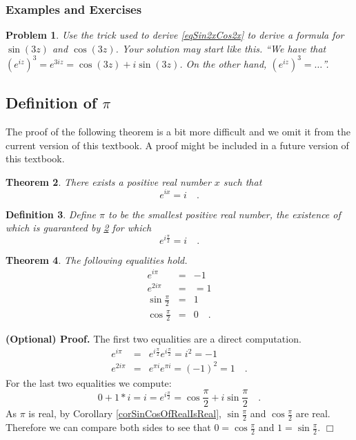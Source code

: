 \documentclass[12pt]{book}
\newenvironment{proofOptional}[1][]{ \noindent \textbf{(Optional) Proof#1.}}{$\Box$\medskip}
\newtheorem{theorem}{Theorem}[section]
\newtheorem{definition}[theorem]{Definition}
\newtheorem{problem}[theorem]{Problem}
\begin{document}
\subsubsection{Examples and Exercises}
\begin{problem}
Use the trick used to derive \eqref{eqSin2xCos2x} to derive a formula for $\sin(3z)$ and $\cos (3z)$. Your solution may start like this. ``We have that $(e^{iz})^3=e^{3iz}=\cos (3z)+i\sin(3z)$. On the other hand, $(e^{iz})^3= \dots$''.
\end{problem}
\subsection{Definition of $\pi$}
\label{secDefinitionPi}

The proof of the following theorem is a bit more difficult and we omit it from the current version of this textbook. A proof might be included in a future version of this textbook.
\begin{theorem}\label{thPiExists}
There exists a positive real number $x$ such that \index{$\pi$}
\begin{equation}\boxed{
e^{ix}=i\quad .
}
\end{equation}
\end{theorem}

\begin{definition}
Define $\pi$ to be the smallest positive real number, the existence of which is guaranteed by \ref{thPiExists} for which
\begin{equation}\boxed{
e^{i\frac{\pi}{2} }= i\quad .
}
\end{equation}
\end{definition}



\begin{theorem} The following equalities hold.
\begin{equation}\label{eqe^ipi}
\begin{array}{rcl}
\displaystyle e^{i\pi}&=&-1\\
\displaystyle e^{2i\pi}&=&=1\\
\displaystyle \sin \frac{\pi}2 &=& 1\\
\displaystyle \cos \frac{\pi}2 &=& 0\quad .
\end{array}
\end{equation}
\end{theorem}
\begin{proofOptional}
The first two equalities are a direct computation.
\[
\begin{array}{rcl}
\displaystyle e^{i\pi}&=&\displaystyle  e^{i\frac{\pi}2}e^{i\frac{\pi}2}= i^2= -1\\
\displaystyle e^{2i\pi}&=&\displaystyle  e^{\pi i} e^{\pi i}= (-1)^2=1\quad .
\end{array}
\]
For the last two equalities we compute:
\[
0+ 1*i=i=e^{i\frac{\pi}2}= \cos \frac{\pi}2 + i\sin \frac\pi 2\quad .
\]
As $\pi$ is real, by Corollary \ref{corSinCosOfRealIsReal}, $\sin\frac{\pi}{2}$ and $\cos \frac{\pi}{2}$ are real. Therefore we can compare both sides to see that $0=\cos \frac{\pi}{2}$ and $1=\sin \frac \pi 2$.
\end{proofOptional}
\end{document}
